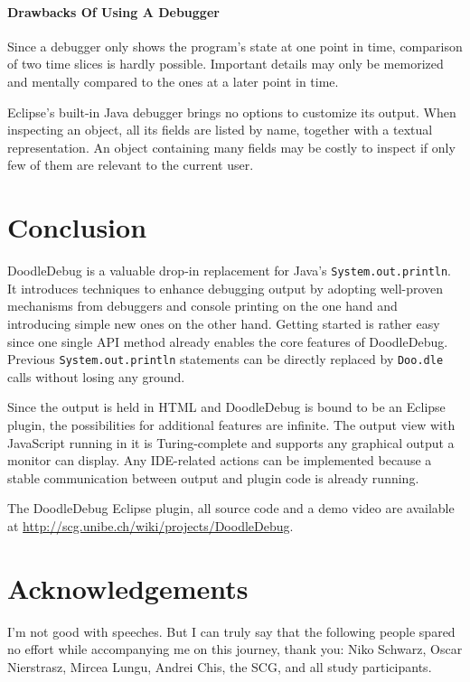\documentclass[english]{scrartcl}
\newcommand{\DD}{Dood\-le\-De\-bug\xspace}
\newcommand{\Doodle}{\texttt{Doo.\-dle}\xspace}
\newcommand{\println}{\texttt{Sys\-tem.\-out.\-println}\xspace}
\begin{document}
\paragraph{Drawbacks Of Using A Debugger}
Since a debugger only shows the program's state at one point in time, comparison of two time slices is hardly possible.
Important details may only be memorized and mentally compared to the ones at a later point in time.

Eclipse's built-in Java debugger brings no options to customize its output.
When inspecting an object, all its fields are listed by name, together with a textual representation.
An object containing many fields may be costly to inspect if only few of them are relevant to the current user.


\section{Conclusion}
\DD is a valuable drop-in replacement for Java's \println.
It introduces techniques to enhance debugging output by adopting well-proven mechanisms from debuggers and console printing on the one hand and introducing simple new ones on the other hand.
Getting started is rather easy since one single API method already enables the core features of \DD.
Previous \println statements can be directly replaced by \Doodle calls without losing any ground.

Since the output is held in HTML and \DD is bound to be an Eclipse plugin, the possibilities for additional features are infinite.
The output view with JavaScript running in it is Turing-complete and supports any graphical output a monitor can display.
Any IDE-related actions can be implemented because a stable communication between output and plugin code is already running.

The DoodleDebug Eclipse plugin, all source code and a demo video are available at \url{http://scg.unibe.ch/wiki/projects/DoodleDebug}.

\section{Acknowledgements}
I'm not good with speeches.
But I can truly say that the following people spared no effort while accompanying me on this journey, thank you:
Niko Schwarz, Oscar Nierstrasz, Mircea Lungu, Andrei Chis, the SCG, and all study participants.



{}
\end{document}
